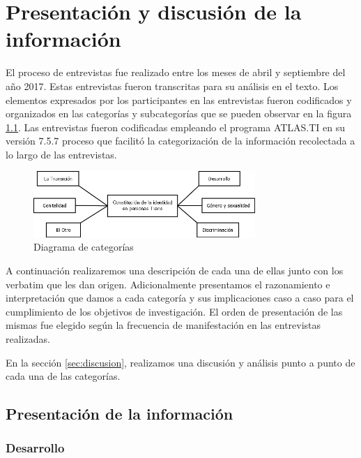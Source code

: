 \chapter{Presentación y discusión de la información}\label{ch:informacion}

El proceso de entrevistas fue realizado entre los meses de abril y septiembre
del año 2017.
Estas entrevistas fueron transcritas para su análisis en el texto.
Los elementos expresados por los participantes en las entrevistas fueron
codificados y organizados en las categorías y subcategorías que se pueden
observar en la figura \ref{fig:categorias}.
Las entrevistas fueron codificadas empleando el programa ATLAS.TI en su versión
7.5.7 proceso que facilitó la categorización de la información recolectada a lo
largo de las entrevistas.

\begin{figure}
    \centering
    \includegraphics[width=0.75\textwidth]{categorias}
    \caption{Diagrama de categorías}
    \label{fig:categorias}
\end{figure}

A continuación realizaremos una descripción de cada una de ellas junto con los
verbatim que les dan origen.
Adicionalmente presentamos el razonamiento e interpretación que damos a cada
categoría y sus implicaciones caso a caso para el cumplimiento de los objetivos
de investigación.
El orden de presentación de las mismas fue elegido
según la frecuencia de manifestación en las entrevistas realizadas.

En la sección \ref{sec:discusion}, realizamos una discusión y análisis punto a
punto de cada una de las categorías.

\section{Presentación de la información}

\subsection{Desarrollo}


